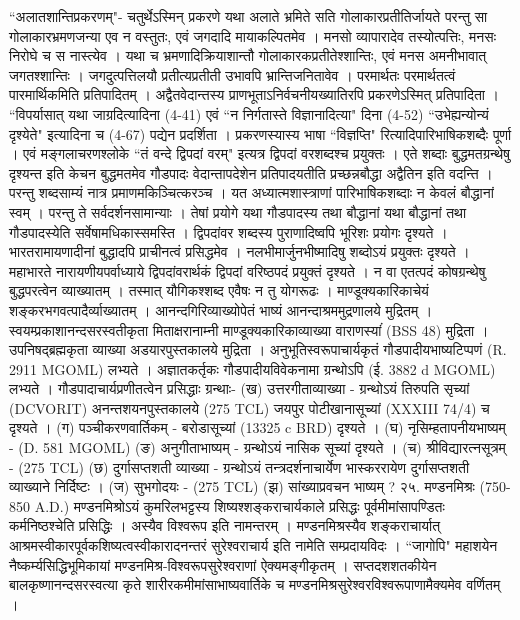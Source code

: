 ``अलातशान्तिप्रकरणम्"- चतुर्थेऽस्मिन् प्रकरणे यथा अलाते भ्रमिते सति गोलाकारप्रतीतिर्जायते परन्तु सा गोलाकारभ्रमणजन्या एव न वस्तुतः, एवं जगदादि मायाकल्पितमेव । मनसो व्यापारादेव तस्योत्पत्तिः, मनसः निरोघे च स नास्त्येव । यथा च भ्रमणादिक्रियाशान्तौ गोलाकारकप्रतीतेश्शान्तिः, एवं मनस अमनीभावात् जगतश्शान्तिः । जगदुत्पत्तिलयौ प्रतीत्यप्रतीती उभावपि भ्रान्तिजनितावेव । परमार्थतः परमार्थतत्वं पारमार्थिकमिति प्रतिपादितम् । अद्वैतवेदान्तस्य प्राणभूताऽनिर्वचनीयख्यातिरपि प्रकरणेऽस्मित् प्रतिपादिता । ``विपर्यासात् यथा जाग्रदित्यादिना (4-41) एवं ``न निर्गतास्ते विज्ञानादित्या" दिना (4-52) ``उभेह्यन्योन्यं दृश्येते" इत्यादिना च (4-67) पद्येन प्रदर्शिता ।
प्रकरणस्यास्य भाषा ``विज्ञप्ति" रित्यादिपारिभाषिकशब्दैः पूर्णा । एवं मङ्गलाचरणश्लोके ``तं वन्दे द्विपदां वरम्" इत्यत्र द्विपदां वरशब्दश्च प्रयुक्तः । एते शब्दाः बुद्धमतग्रन्थेषु दृश्यन्त इति केचन बुद्धमतमेव गौडपादः वेदान्तापदेशेन प्रतिपादयतीति प्रच्छन्नबौद्धा अद्वैतिन इति वदन्ति ।
परन्तु शब्दसाम्यं नात्र प्रमाणमकिञ्चित्करञ्च । यत अध्यात्मशास्त्राणां पारिभाषिकशब्दाः न केवलं बौद्धानां स्वम् । परन्तु ते सर्वदर्शनसामान्याः । तेषां प्रयोगे यथा गौडपादस्य तथा बौद्धानां यथा बौद्धानां तथा गौडपादस्येति सर्वेषामधिकास्समस्ति । द्विपदांवर शब्दस्य पुराणादिष्वपि भूरिशः प्रयोगः दृश्यते । भारतरामायणादीनां बुद्धादपि प्राचीनत्वं प्रसिद्धमेव । नलभीमार्जुनभीष्मादिषु शब्दोऽयं प्रयुक्तः दृश्यते । महाभारते नारायणीयपर्वाध्याये द्विपदांवरार्थकं द्विपदां वरिष्ठपदं प्रयुक्तं दृश्यते । न वा एतत्पदं कोषग्रन्थेषु बुद्धपरत्वेन व्याख्यातम् । तस्मात् यौगिकश्शब्द एवैषः न तु योगरूढः ।
माण्डूक्यकारिकाचेयं शङ्करभगवत्पादैर्व्याख्यातम् । आनन्दगिरिव्याख्योपेतं भाष्यं आनन्दाश्रममुद्रणालये मुद्रितम् । स्वयम्प्रकाशानन्दसरस्वतीकृता मिताक्षरानाम्नी माण्डूक्यकारिकाव्याख्या वाराणस्यांं (BSS 48) मुद्रिता । उपनिषद्ब्रह्मकृता व्याख्या अडयारपुस्तकालये मुद्रिता । अनुभूतिस्वरूपाचार्यकृतं गौडपादीयभाष्यटिप्पणं (R. 2911 MGOML) लभ्यते । अज्ञातकर्तृकः गौडपादीयविवेकनामा ग्रन्थोऽपि (ई. 3882 d MGOML) लभ्यते । गौडपादाचार्यप्रणीतत्वेन प्रसिद्धाः ग्रन्थाः-
(ख) उत्तरगीताव्याख्या - ग्रन्थोऽयं तिरुपति सृच्यां (DCVORIT) अनन्तशयनपुस्तकालये (275 TCL) जयपुर पोटीखानासूच्यां (XXXIII 74/4) च दृश्यते ।
(ग) पञ्चीकरणवार्तिकम् - बरोडासूच्यां (13325 c BRD) दृश्यते ।
(घ) नृसिम्हतापनीयभाष्यम् - (D. 581 MGOML)
(ङ) अनुगीताभाष्यम् - ग्रन्थोऽयं नासिक सूच्यां दृश्यते ।
(च) श्रीविद्यारत्नसूत्रम् - (275 TCL)
(छ) दुर्गासप्तशती व्याख्या - ग्रन्थोऽयं तन्त्रदर्शनाचार्येण भास्कररायेण दुर्गासप्तशती व्याख्याने निर्दिष्टः ।
(ज) सुभगोदयः - (275 TCL)
(झ) सांख्याप्रवचन भाष्यम् ?
२५. मण्डनमिश्रः (750-850 A.D.)
मण्डनमिश्रोऽयं कुमरिलभट्टस्य शिष्यश्शङ्कराचार्यकाले प्रसिद्धः पूर्वमीमांसापण्डितः कर्मनिष्ठश्चेति प्रसिद्धिः । अस्यैव विश्वरूप इति नामन्तरम् । मण्डनमिश्रस्यैव शङ्कराचार्यात् आश्रमस्वीकारपूर्वकशिष्यत्वस्वीकारादनन्तरं सुरेश्वराचार्य इति नामेति सम्प्रदायविदः । ``जागोपि" महाशयेन नैष्कर्म्यसिद्धिभूमिकायां मण्डनमिश्र-विश्वरूपसुरेश्वराणां ऐक्यमङ्गीकृतम् । सप्तदशशतकीयेन बालकृष्णानन्दसरस्वत्या कृते शारीरकमीमांसाभाष्यवार्तिके च मण्डनमिश्रसुरेश्वरविश्वरूपाणामैक्यमेव वर्णितम् ।
